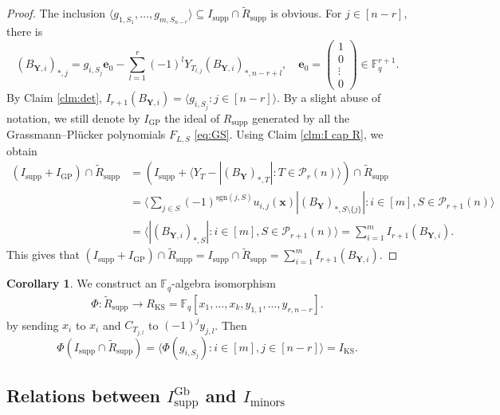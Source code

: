 \documentclass[a4paper, 11pt]{amsart}
\newcommand{\mc}[1]{\mathcal{#1}}
\newcommand{\mr}[1]{\mathrm{#1}}
\newcommand{\ideala}[1]{\langle{#1}\rangle}
\newcommand{\ssm}[1]{\sum_{#1}}
\newcommand{\td}[1]{\bm{#1}}
\newcommand{\tld}[1]{\tilde{#1}}
\newcommand{\tx}[1]{\text{#1}}
\newcommand{\fq}{\mathbb{F}_q}
\theoremstyle{definition}
\newtheorem{corollary}[theorem]{Corollary}
\theoremstyle{definition}
\begin{document}
	\begin{proof}
		The inclusion $\ideala{g_{1,S_1},\dots,g_{m,S_{n-r}}}\subseteq I_{\tx{supp}}\cap \tld{R}_{\tx{supp}}$ is obvious. For $j\in[n-r]$, there is 
		\begin{equation*}
			(B_{\td{Y},i})_{*,j}=g_{i,S_j}\td{e}_0-\sum^r_{l=1}(-1)^lY_{T_{l,j}}(B_{\td{Y},i})_{*,n-r+l},\quad\td{e}_0=\begin{pmatrix}
				1\\0\\\vdots\\0
			\end{pmatrix}\in\fq^{r+1}.
		\end{equation*}
		By Claim \ref{clm:det}, $I_{r+1}(B_{\td{Y},i})=\ideala{g_{i,S_j}:j\in[n-r]}$. By a slight abuse of notation, we still denote by $I_{\tx{GP}}$ the ideal of $R_{\tx{supp}}$ generated by all the Grassmann–Plücker polynomials $F_{L,S}$ \eqref{eq:GS}. Using Claim \ref{clm:I cap R}, we obtain
		\begin{align*}
			(I_{\tx{supp}}+I_{\tx{GP}})\cap \tld{R}_{\tx{supp}}&=(I_{\tx{supp}}+\ideala{Y_T-|(B_{\td{Y}})_{*,T}|:T\in\mc{P}_r(n)})\cap\tld{R}_{\tx{supp}}\\
			&=\ideala{\ssm{j\in S}(-1)^{\tx{sgn}(j,S)}u_{i,j}(\td{x})|(B_{\td{Y}})_{*,S\setminus\{j\}}|:i\in[m],S\in\mc{P}_{r+1}(n)}\\
			&=\ideala{|(B_{\td{Y},i})_{*,S}|:i\in[m],S\in\mc{P}_{r+1}(n)}=\sum^m_{i=1}I_{r+1}(B_{\td{Y},i}).
		\end{align*}
		This gives that $(I_{\tx{supp}}+I_{\tx{GP}})\cap\tld{R}_{\tx{supp}}=I_{\tx{supp}}\cap\tld{R}_{\tx{supp}}=\sum^m_{i=1}I_{r+1}(B_{\td{Y},i})$.
	\end{proof}
	
	\begin{corollary}
		We construct an $\fq$-algebra isomorphism
		\begin{align*}
			\Phi:\tld{R}_{\tx{supp}}\to R_{\tx{KS}}=\fq[x_1,\dots,x_k,y_{1,1},\dots,y_{r,n-r}].
		\end{align*}
		by sending $x_i$ to $x_i$ and $C_{T_{j,l}}$ to $(-1)^jy_{j,l}$. Then
		\begin{equation*}
			\Phi(I_{\tx{supp}}\cap\tld{R}_{\tx{supp}})=\ideala{\Phi(g_{i,S_j}):i\in[m],j\in[n-r]}=I_{\tx{KS}}.
		\end{equation*}
	\end{corollary}
	
	\subsection{Relations between $I^{\mr{Gb}}_{\mr{supp}}$ and $I_{\mr{minors}}$}\,
	
\end{document}
